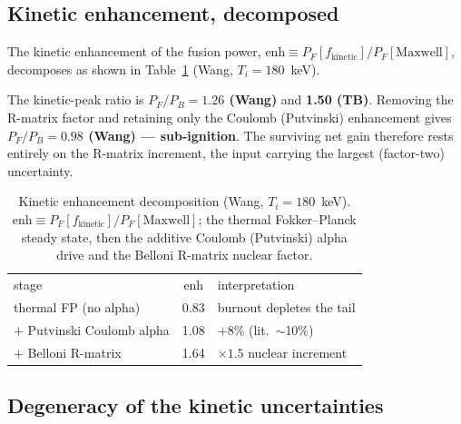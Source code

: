 \documentclass[aip,pop,reprint,amsmath,amssymb,floatfix]{revtex4-2}
\begin{document}
\subsection{Kinetic enhancement, decomposed}

The kinetic enhancement of the fusion power, $\mathrm{enh}\equiv P_F[f_\mathrm{kinetic}]/P_F[\mathrm{Maxwell}]$, decomposes as shown in Table~\ref{tab:decomp} (Wang, $T_i = 180$~keV).

The kinetic-peak ratio is \textbf{$P_F/P_B = 1.26$ (Wang)} and \textbf{1.50 (TB)}. Removing the R-matrix factor and retaining only the Coulomb (Putvinski) enhancement gives \textbf{$P_F/P_B = 0.98$ (Wang) --- sub-ignition}. The surviving net gain therefore rests entirely on the R-matrix increment, the input carrying the largest (factor-two) uncertainty.

\begin{table}[b]
\caption{Kinetic enhancement decomposition (Wang, $T_i = 180$~keV). $\mathrm{enh}\equiv P_F[f_\mathrm{kinetic}]/P_F[\mathrm{Maxwell}]$; the thermal Fokker--Planck steady state, then the additive Coulomb (Putvinski) alpha drive and the Belloni R-matrix nuclear factor.}
\label{tab:decomp}
\begin{ruledtabular}
\begin{tabular}{lcl}
stage & enh & interpretation \\
\colrule
thermal FP (no alpha) & 0.83 & burnout depletes the tail \\
$+$ Putvinski Coulomb alpha & 1.08 & $+8\%$ (lit.\ $\sim$10\%) \\
$+$ Belloni R-matrix & 1.64 & $\times1.5$ nuclear increment \\
\end{tabular}
\end{ruledtabular}
\end{table}

\subsection{Degeneracy of the kinetic uncertainties}
\end{document}
